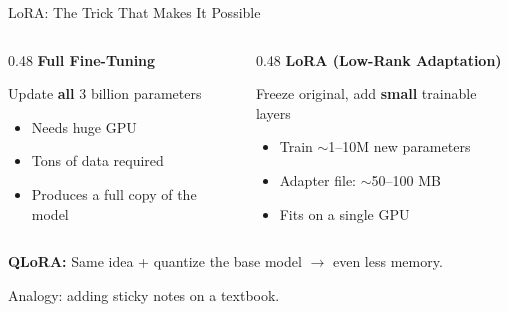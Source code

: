 \documentclass[aspectratio=169]{beamer}
\begin{document}
\begin{frame}{LoRA: The Trick That Makes It Possible}
    \begin{columns}[T]
        \begin{column}{0.48\textwidth}
            \textbf{Full Fine-Tuning}

            \vspace{0.5em}
            \begin{tcolorbox}[colback=red!5, colframe=red!40, boxrule=0.5pt, arc=2pt]
                Update \textbf{all} 3 billion parameters

                \vspace{0.3em}
                {\small
                \begin{itemize}
                    \item Needs huge GPU
                    \item Tons of data required
                    \item Produces a full copy of the model
                \end{itemize}
                }
            \end{tcolorbox}
        \end{column}
        \begin{column}{0.48\textwidth}
            \textbf{LoRA (Low-Rank Adaptation)}

            \vspace{0.5em}
            \begin{tcolorbox}[colback=green!5, colframe=green!40, boxrule=0.5pt, arc=2pt]
                Freeze original, add \textbf{small} trainable layers

                \vspace{0.3em}
                {\small
                \begin{itemize}
                    \item Train $\sim$1--10M new parameters
                    \item Adapter file: $\sim$50--100 MB
                    \item Fits on a single GPU
                \end{itemize}
                }
            \end{tcolorbox}
        \end{column}
    \end{columns}

    \vspace{1em}
    \textbf{QLoRA:} Same idea + quantize the base model $\rightarrow$ even less memory.

    \vspace{0.5em}
    Analogy: adding sticky notes on a textbook.
\end{frame}
\end{document}
